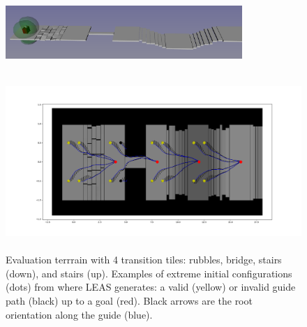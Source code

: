 \begin{figure}[h]
    \centering
    \includegraphics[width=0.8\textwidth,trim={0cm 0cm 0cm 0cm},clip, height=3.5cm]{Figures/Chapter_LEAS/1x11_tests.png}
    \includegraphics[width=\textwidth,trim={5cm 2cm 4cm 2cm},clip, height=6cm]{Figures/Chapter_LEAS/1x11_example_180deg.png}
    \caption{Evaluation terrrain with 4 transition tiles: rubbles, bridge, stairs (down), and stairs (up). Examples of extreme initial configurations (dots) from where LEAS generates: a valid (yellow) or invalid guide path (black) up to a goal (red). Black arrows are the root orientation along the guide (blue).}
    \label{fig:tests_1x11}
\end{figure}


